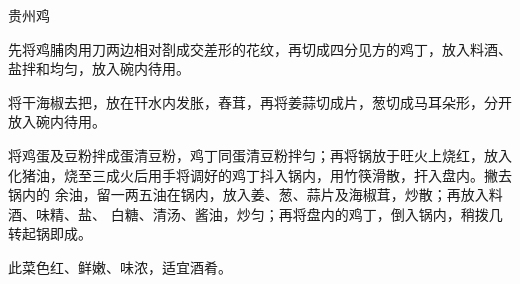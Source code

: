 \begin{recipe}{贵州鸡}

\ingredients


\cooking

\step 先将鸡脯肉用刀两边相对剳成交差形的花纹，再切成四分见方的鸡丁，放入料酒、
盐拌和均匀，放入碗内待用。

\step 将干海椒去把，放在幵水内发胀，舂茸，再将姜蒜切成片，葱切成马耳朵形，分开
放入碗内待用。

\step 将鸡蛋及豆粉拌成蛋清豆粉，鸡丁同蛋清豆粉拌匀；再将锅放于旺火上烧红，放入
化猪油，烧至三成火后用手将调好的鸡丁抖入锅内，用竹筷滑散，扞入盘内。撇去锅内的
余油，留一两五油在锅内，放入姜、葱、蒜片及海椒茸，炒散；再放入料酒、味精、盐、
白糖、清汤、酱油，炒匀；再将盘内的鸡丁，倒入锅内，稍拨几转起锅即成。

\features

此菜色红、鲜嫩、味浓，适宜酒肴。

\end{recipe}

